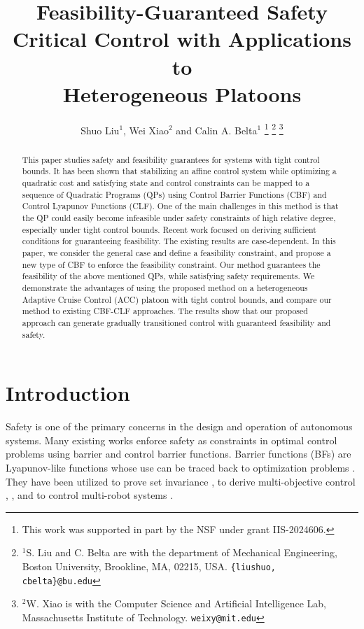 \documentclass[letterpaper, 10 pt, conference]{ieeeconf}
\title{\LARGE \bf
Feasibility-Guaranteed Safety Critical Control with Applications to\\ Heterogeneous Platoons}
\author{Shuo Liu$^{1}$, Wei Xiao$^{2}$ and Calin A. Belta$^{1}$%
\thanks{This work was supported in part by the NSF under grant IIS-2024606.}
\thanks{$^{1}$S. Liu and C. Belta are with the department of Mechanical Engineering, Boston
University, Brookline, MA, 02215, USA. 
        {\tt\small \{liushuo, cbelta\}@bu.edu}}%
\thanks{$^{2}$W. Xiao is with the Computer Science and Artificial Intelligence Lab, Massachusetts Institute of Technology. 
        {\tt\small weixy@mit.edu}}%
}
\theoremstyle{definition}
\begin{document}
 
\maketitle

\begin{abstract}
This paper studies safety and feasibility guarantees for systems with tight control bounds. It has been shown that stabilizing an affine control system while optimizing a quadratic cost and satisfying state and control constraints can be mapped to a sequence of Quadratic Programs (QPs) using Control Barrier Functions (CBF) and Control Lyapunov Functions (CLF). One of the main challenges in this method is that the QP could easily become infeasible under safety constraints of high relative degree, especially under tight control bounds. Recent work focused on deriving sufficient conditions for guaranteeing feasibility. The existing results are case-dependent. In this paper, we consider the general case and define a feasibility constraint, and propose a new type of CBF to enforce the feasibility constraint.  Our method guarantees the feasibility of the above mentioned QPs, while satisfying safety requirements. We demonstrate the advantages of using the proposed method on a heterogeneous Adaptive Cruise Control (ACC) platoon with tight control bounds, and compare our method to existing CBF-CLF approaches. The results show that our proposed approach can generate gradually transitioned control with guaranteed feasibility and safety. 
\end{abstract}



\section{Introduction}
\label{sec:Introduction}

Safety is one of the primary concerns in
the design and operation of autonomous systems. Many existing works enforce safety as constraints in optimal control problems using barrier and control barrier functions. Barrier functions (BFs) are Lyapunov-like functions \cite{tee2009barrier} whose use can be traced back to optimization problems \cite{boyd2004convex}. They have been utilized to prove set invariance \cite{aubin2011viability}, \cite{prajna2007framework} to derive multi-objective control \cite{panagou2013multi}, \cite{wang2016multi}, and to control multi-robot systems
\cite{glotfelter2017nonsmooth}. 
\end{document}
